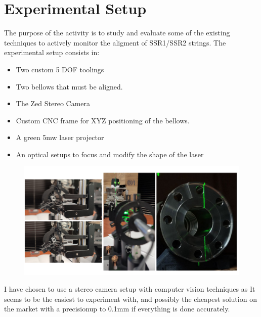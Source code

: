 \documentclass[12pt,a4paper]{article}
\begin{document}
\newpage
\section{Experimental Setup}
The purpose of the activity is to study and evaluate some of the existing techniques to actively monitor the aligment of SSR1/SSR2 strings.
The experimental setup consists in:
\begin{itemize}
    \item Two custom 5 DOF toolings
    \item Two bellows that must be aligned.
    \item The Zed Stereo Camera
    \item Custom CNC frame for XYZ positioning of the bellows. 
    \item A green 5mw laser projector
    \item An optical setups to focus and modify the shape of the laser
\end{itemize}
\begin{figure}[h!]
\centering
\includegraphics[width=\textwidth]{15.png}
\end{figure}
I have chosen to use a stereo camera setup with computer vision techniques as It seems to be the easiest to experiment with, and possibly the cheapest solution on the market with a precisionup to 0.1mm if everything is done accurately.
\end{document}
